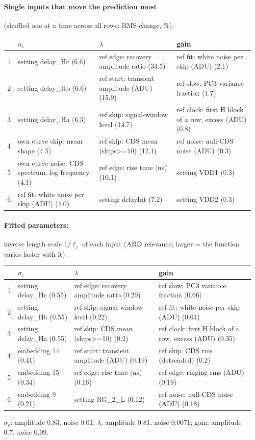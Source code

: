 \paragraph{Single inputs that move the prediction most} (shuffled one at a time across all rows; RMS change, \%):
\begin{center}\footnotesize
\begin{tabular}{rp{}p{}p{}}
\toprule
 & $\sigma_e$ & $\lambda$ & gain \\
\midrule
1 & setting delay\_Hc (6.6) & ref edge: recovery amplitude ratio (34.5) & ref fit: white noise per skip (ADU) (2.1) \\
2 & setting delay\_Hb (6.6) & ref start: transient amplitude (ADU) (15.9) & ref slow: PC3 variance fraction (1.7) \\
3 & setting delay\_Ha (6.3) & ref skip: signal-window level (14.7) & ref clock: first H block of a row, excess (ADU) (0.8) \\
4 & own curve skip: mean shape (4.5) & ref skip: CDS mean (skips>=10) (12.1) & ref noise: null-CDS noise (ADU) (0.3) \\
5 & own curve noise: CDS spectrum, log frequency (4.1) & ref edge: rise time (ns) (10.1) & setting VDD1 (0.3) \\
6 & ref fit: white noise per skip (ADU) (4.0) & setting delayInt (7.2) & setting VDD2 (0.3) \\
\bottomrule
\end{tabular}
\end{center}
\paragraph{Fitted parameters:} inverse length scale $1/\ell_j$ of each input (ARD relevance; larger = the function varies faster with it).
\begin{center}\footnotesize
\begin{tabular}{rp{}p{}p{}}
\toprule
 & $\sigma_e$ & $\lambda$ & gain \\
\midrule
1 & setting delay\_Hc (0.55) & ref edge: recovery amplitude ratio (0.29) & ref slow: PC3 variance fraction (0.66) \\
2 & setting delay\_Hb (0.55) & ref skip: signal-window level (0.22) & ref fit: white noise per skip (ADU) (0.64) \\
3 & setting delay\_Ha (0.55) & ref skip: CDS mean (skips>=10) (0.2) & ref clock: first H block of a row, excess (ADU) (0.35) \\
4 & embedding 14 (0.41) & ref start: transient amplitude (ADU) (0.19) & ref skip: CDS rms (detrended) (0.2) \\
5 & embedding 15 (0.34) & ref edge: rise time (ns) (0.16) & ref edge: ringing rms (ADU) (0.19) \\
6 & embedding 9 (0.21) & setting RG\_2\_L (0.12) & ref noise: null-CDS noise (ADU) (0.18) \\
\bottomrule
\end{tabular}
\end{center}
{\footnotesize $\sigma_e$: amplitude 0.83, noise 0.01; $\lambda$: amplitude 0.81, noise 0.0071; gain: amplitude 0.7, noise 0.09.}
